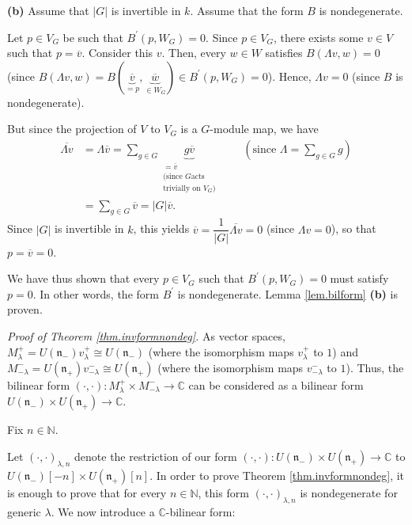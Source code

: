 \documentclass
[numbers=enddot,12pt,final,onecolumn,german,notitlepage]{scrartcl}%
\theoremstyle{definition}
\begin{document}
\textbf{(b)} Assume that $\left\vert G\right\vert $ is invertible in $k$.
Assume that the form $B$ is nondegenerate.

Let $p\in V_{G}$ be such that $B^{\prime}\left(  p,W_{G}\right)  =0$. Since
$p\in V_{G}$, there exists some $v\in V$ such that $p=\overline{v}$. Consider
this $v$. Then, every $w\in W$ satisfies $B\left(  \Lambda v,w\right)  =0$
(since $B\left(  \Lambda v,w\right)  =B\left(  \underbrace{\overline{v}}%
_{=p},\underbrace{\overline{w}}_{\in W_{G}}\right)  \in B^{\prime}\left(
p,W_{G}\right)  =0$). Hence, $\Lambda v=0$ (since $B$ is nondegenerate).

But since the projection of $V$ to $V_{G}$ is a $G$-module map, we have
\begin{align*}
\overline{\Lambda v}  &  =\Lambda\overline{v}=\sum\limits_{g\in G}%
\underbrace{g\overline{v}}_{\substack{=\overline{v}\\\text{(since }G\text{
acts}\\\text{trivially on }V_{G}\text{)}}}\ \ \ \ \ \ \ \ \ \ \left(
\text{since }\Lambda=\sum\limits_{g\in G}g\right) \\
&  =\sum\limits_{g\in G}\overline{v}=\left\vert G\right\vert \overline{v}.
\end{align*}
Since $\left\vert G\right\vert $ is invertible in $k$, this yields
$\overline{v}=\dfrac{1}{\left\vert G\right\vert }\overline{\Lambda v}=0$
(since $\Lambda v=0$), so that $p=\overline{v}=0$.

We have thus shown that every $p\in V_{G}$ such that $B^{\prime}\left(
p,W_{G}\right)  =0$ must satisfy $p=0$. In other words, the form $B^{\prime}$
is nondegenerate. Lemma \ref{lem.bilform} \textbf{(b)} is proven.

\textit{Proof of Theorem \ref{thm.invformnondeg}.} As vector spaces,
$M_{\lambda}^{+}=U\left(  \mathfrak{n}_{-}\right)  v_{\lambda}^{+}\cong
U\left(  \mathfrak{n}_{-}\right)  $ (where the isomorphism maps $v_{\lambda
}^{+}$ to $1$) and $M_{-\lambda}^{-}=U\left(  \mathfrak{n}_{+}\right)
v_{-\lambda}^{-}\cong U\left(  \mathfrak{n}_{+}\right)  $ (where the
isomorphism maps $v_{-\lambda}^{-}$ to $1$). Thus, the bilinear form $\left(
\cdot,\cdot\right)  :M_{\lambda}^{+}\times M_{-\lambda}^{-}\rightarrow
\mathbb{C}$ can be considered as a bilinear form $U\left(  \mathfrak{n}%
_{-}\right)  \times U\left(  \mathfrak{n}_{+}\right)  \rightarrow\mathbb{C}$.

Fix $n\in\mathbb{N}$.

Let $\left(  \cdot,\cdot\right)  _{\lambda,n}$ denote the restriction of our
form $\left(  \cdot,\cdot\right)  :U\left(  \mathfrak{n}_{-}\right)  \times
U\left(  \mathfrak{n}_{+}\right)  \rightarrow\mathbb{C}$ to $U\left(
\mathfrak{n}_{-}\right)  \left[  -n\right]  \times U\left(  \mathfrak{n}%
_{+}\right)  \left[  n\right]  $. In order to prove Theorem
\ref{thm.invformnondeg}, it is enough to prove that for every $n\in\mathbb{N}%
$, this form $\left(  \cdot,\cdot\right)  _{\lambda,n}$ is nondegenerate for
generic $\lambda$. We now introduce a $\mathbb{C}$-bilinear form:
\end{document}
